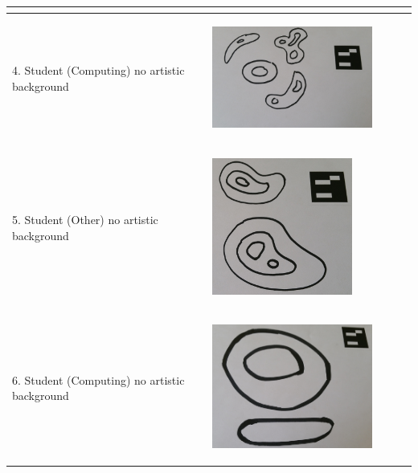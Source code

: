\documentclass[11pt]{article}
\begin{document}
\begin{landscape}
\begin{longtable}{p{}| p{}| p{} | p{} |p{}}
							& \begin{center}\end{center} & \\
\hline
4. Student (Computing)
	no artistic background & \begin{center}\includegraphics[scale=0.5]{pics/usertesting/4.png}\end{center} 
							& \begin{center}\end{center} & \\
\hline
5. Student (Other)
	no artistic background & \begin{center}\includegraphics[scale=0.5]{pics/usertesting/5.png}\end{center} 
							& \begin{center}\end{center} & \\
\hline
6. Student (Computing)
	no artistic background & \begin{center}\includegraphics[scale=0.5]{pics/usertesting/6.png}\end{center} 
							& \begin{center}\end{center} & \\

\end{longtable}
\end{landscape}
\end{document}
